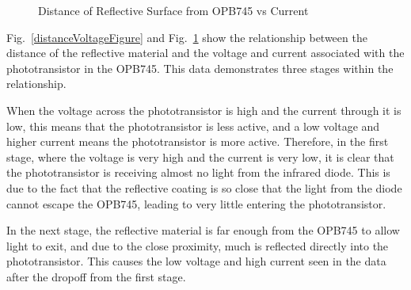 \documentclass[conference]{IEEEtran}
\begin{document}
\begin{figure}[htbp]
    \caption{Distance of Reflective Surface from OPB745 vs Current}
    \label{distanceCurrentFigure}
\end{figure}

Fig.~\ref{distanceVoltageFigure} and Fig.~\ref{distanceCurrentFigure}
show the relationship between the distance of the reflective
material and the voltage and current associated with the
phototransistor in the OPB745. This data demonstrates three
stages within the relationship. 

When the voltage across the phototransistor is high and
the current through it is low, this means that the phototransistor is
less active, and a low voltage and higher current means
the phototransistor is more active. Therefore, in the first
stage, where the voltage is very high and the current is very
low, it is clear that the phototransistor is receiving almost
no light from the infrared diode. This is due to the fact
that the reflective coating is so close that the light from
the diode cannot escape the OPB745, leading to very little entering
the phototransistor.

In the next stage, the reflective material is far enough
from the OPB745 to allow light to exit, and due to the close
proximity, much is reflected directly into the phototransistor.
This causes the low voltage and high current seen in the data
after the dropoff from the first stage.
\end{document}
